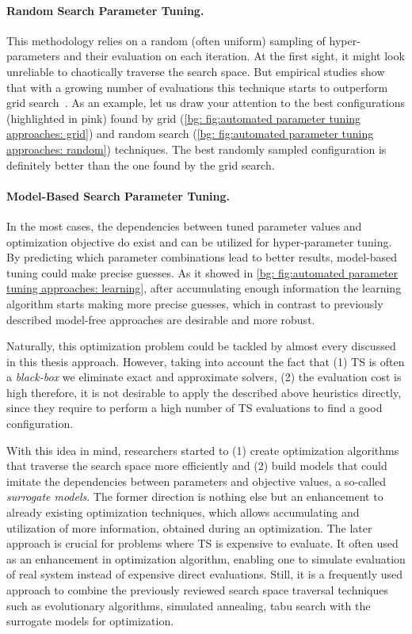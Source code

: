 \paragraph{Random Search Parameter Tuning.} This methodology relies on a random (often uniform) sampling of hyper-parameters and their evaluation on each iteration. At the first sight, it might look unreliable to chaotically traverse the search space. But empirical studies show that with a growing number of evaluations this technique starts to outperform grid search~\cite{bergstra2012random}. As an example, let us draw your attention to the best configurations (highlighted in pink) found by grid (\cref{bg: fig:automated parameter tuning approaches: grid}) and random search (\cref{bg: fig:automated parameter tuning approaches: random}) techniques. The best randomly sampled configuration is definitely better than the one found by the grid search.

\paragraph{Model-Based Search Parameter Tuning.} In the most cases, the dependencies between tuned parameter values and optimization objective do exist and can be utilized for hyper-parameter tuning. By predicting which parameter combinations lead to better results, model-based tuning could make precise guesses. As it showed in \cref{bg: fig:automated parameter tuning approaches: learning}, after accumulating enough information the learning algorithm starts making more precise guesses, which in contrast to previously described model-free approaches are desirable and more robust.

Naturally, this optimization problem could be tackled by almost every discussed in this thesis approach. However, taking into account the fact that (1) TS is often a \textit{black-box} we eliminate exact and approximate solvers, (2) the evaluation cost is high therefore, it is not desirable to apply the described above heuristics directly, since they require to perform a high number of TS evaluations to find a good configuration.

With this idea in mind, researchers started to (1) create optimization algorithms that traverse the search space more efficiently and (2) build models that could imitate the dependencies between parameters and objective values, a so-called \textit{surrogate models}. The former direction is nothing else but an enhancement to already existing optimization techniques, which allows accumulating and utilization of more information, obtained during an optimization. The later approach is crucial for problems where TS is expensive to evaluate.
It often used as an enhancement in optimization algorithm, enabling one to simulate evaluation of real system instead of expensive direct evaluations. Still, it is a frequently used approach to combine the previously reviewed search space traversal techniques such as evolutionary algorithms, simulated annealing, tabu search with the surrogate models for optimization.


